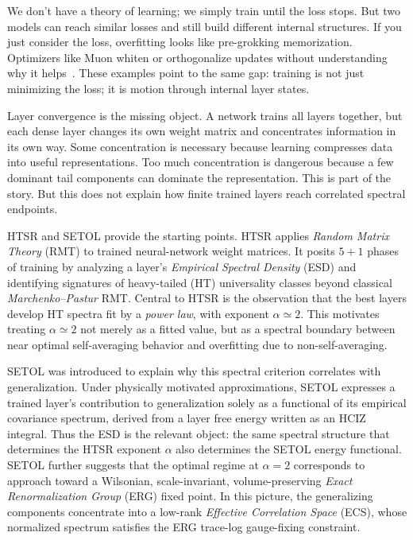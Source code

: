 \documentclass[10pt,twocolumn]{article}
\begin{document}
We don't have a theory of learning; we simply train until the loss stops.
But two models can reach similar losses and still build different internal structures.
If you just consider the loss, overfitting looks like pre-grokking memorization.
Optimizers like Muon whiten or orthogonalize updates without understanding why it helps~\cite{JordanMuon2024}.
These examples point to the same gap: training is not just minimizing the loss; it is motion through internal layer states.

Layer convergence is the missing object. A network trains all layers together, but each dense layer changes its own weight matrix and concentrates information in its own way. Some concentration is necessary because learning compresses data into useful representations.
Too much concentration is dangerous because a few dominant tail components can dominate the representation.
This is part of the story. But this does not explain how finite trained layers reach correlated spectral endpoints.

HTSR and SETOL provide the starting points. HTSR applies \emph{Random Matrix Theory} (RMT) to trained neural-network weight matrices.
It posits $5+1$ phases of training by analyzing a layer's \emph{Empirical Spectral Density} (ESD) and identifying signatures of heavy-tailed (HT)
universality classes beyond classical \emph{Marchenko--Pastur} RMT.
Central to HTSR is the observation that the best layers develop HT spectra fit by a \emph{power law}, with exponent $\alpha \simeq 2$.
This motivates treating $\alpha \simeq 2$ not merely as a fitted value, but as a
spectral boundary between near optimal self-averaging behavior and overfitting due to non-self-averaging.

SETOL was introduced to explain why this spectral criterion correlates with generalization. Under physically motivated approximations, SETOL expresses a trained layer's contribution to generalization solely as a functional of its empirical covariance spectrum, derived from a layer free energy written as an HCIZ integral. Thus the ESD is the relevant object: the same spectral structure that determines the HTSR exponent $\alpha$ also determines the SETOL energy functional. SETOL further suggests that the optimal regime at $\alpha = 2$ corresponds to approach toward a Wilsonian, scale-invariant, volume-preserving \emph{Exact Renormalization Group} (ERG) fixed point. In this picture, the generalizing components concentrate into a low-rank \emph{Effective Correlation Space} (ECS), whose normalized spectrum satisfies the ERG trace-log gauge-fixing constraint.
\end{document}
